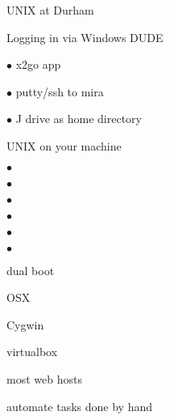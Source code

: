 \documentclass[a4paper,portrait,12pt]{article}
\begin{document}
\begin{flushleft}
\newpage
\newpage
UNIX at Durham
\end{flushleft}


\begin{flushleft}
Logging in via Windows DUDE
\end{flushleft}


\begin{flushleft}
$\bullet$ x2go app
\end{flushleft}


\begin{flushleft}
$\bullet$ putty/ssh to mira
\end{flushleft}


\begin{flushleft}
$\bullet$ J drive as home directory
\end{flushleft}





\begin{flushleft}
\newpage
UNIX on your machine
\end{flushleft}


$\bullet$


$\bullet$


$\bullet$


$\bullet$


$\bullet$


$\bullet$





\begin{flushleft}
dual boot
\end{flushleft}


\begin{flushleft}
OSX
\end{flushleft}


\begin{flushleft}
Cygwin
\end{flushleft}


\begin{flushleft}
virtualbox
\end{flushleft}


\begin{flushleft}
most web hosts
\end{flushleft}


\begin{flushleft}
automate tasks done by hand
\end{flushleft}
\end{document}
